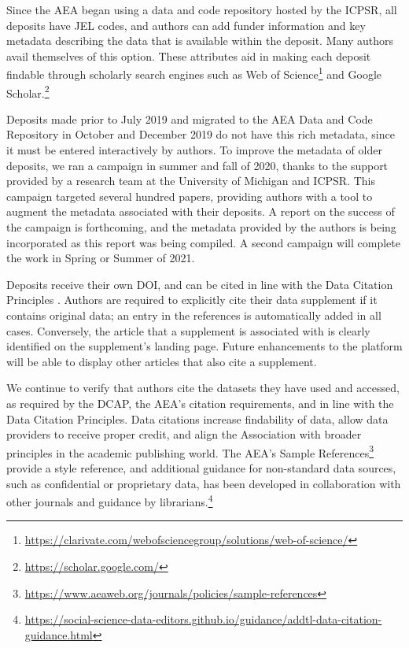 \documentclass[PP]{AEA}
\newcommand{\urlcite}[2]{#2\footnote{\url{#1}}}
\newcommand{\purlcite}[2]{#2.\footnote{\url{#1}}}
\begin{document}
Since the AEA began using a data and code repository hosted by the \ac{ICPSR}, all deposits have JEL codes, and authors can add funder information and key metadata describing the data that is available within the deposit. Many authors avail themselves of this option. These attributes aid in making each deposit  findable through scholarly search engines such as \urlcite{https://clarivate.com/webofsciencegroup/solutions/web-of-science/}{Web of Science} and \purlcite{https://scholar.google.com/}{Google Scholar}

Deposits made prior to July 2019 and  migrated to the AEA Data and Code Repository in October and December 2019 do not have this rich metadata, since it must be entered interactively by authors. To improve the metadata of older deposits, we ran a campaign in summer and fall of 2020, thanks to the support provided by a research team at the University of Michigan and ICPSR. This campaign targeted several hundred papers, providing authors with a tool to augment the metadata associated with their deposits. A report on the success of the campaign is forthcoming, and the metadata provided by the authors is being incorporated as this report was being compiled. A second campaign will complete the work in Spring or Summer of 2021. 

Deposits receive their own \ac{DOI}, and can be cited in line with the Data Citation Principles \citep{Altman2013-fl,jddcp}. Authors are required to explicitly cite their data supplement if it contains original data; an entry in the references is automatically added in all cases. Conversely, the article that a supplement is associated with is clearly identified on the supplement's landing page. Future enhancements to the platform will be able to display other articles that also cite a supplement. 

We continue to verify that authors cite the datasets they have used and accessed, as required by the \ac{DCAP}, the AEA's citation requirements, and in line with the Data Citation Principles.  Data citations increase findability of data, allow data providers to receive proper credit, and align the Association with broader principles in the academic publishing world. The AEA's  \urlcite{https://www.aeaweb.org/journals/policies/sample-references}{Sample References} provide a style reference, and additional guidance for non-standard data sources, such as confidential or proprietary data, has been developed in collaboration with other journals and guidance by \purlcite{https://social-science-data-editors.github.io/guidance/addtl-data-citation-guidance.html}{librarians}
\end{document}
